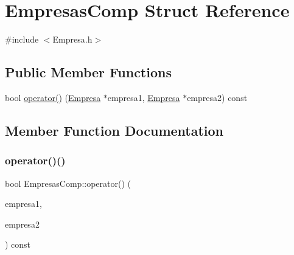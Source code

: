 \hypertarget{structEmpresasComp}{}\section{Empresas\+Comp Struct Reference}
\label{structEmpresasComp}


{\ttfamily \#include $<$Empresa.\+h$>$}

\subsection*{Public Member Functions}
\begin{DoxyCompactItemize}
\item 
bool \hyperlink{structEmpresasComp_a65f437399b6aa939ee84611a69ee0ad0}{operator()} (\hyperlink{classEmpresa}{Empresa} $\ast$empresa1, \hyperlink{classEmpresa}{Empresa} $\ast$empresa2) const
\end{DoxyCompactItemize}


\subsection{Member Function Documentation}
\mbox{\label{structEmpresasComp_a65f437399b6aa939ee84611a69ee0ad0}} 
\subsubsection{\texorpdfstring{operator()()}{operator()()}}
{\footnotesize\ttfamily bool Empresas\+Comp\+::operator() (\begin{DoxyParamCaption}\item[{\hyperlink{classEmpresa}{Empresa} $\ast$}]{empresa1,  }\item[{\hyperlink{classEmpresa}{Empresa} $\ast$}]{empresa2 }\end{DoxyParamCaption}) const\hspace{0.3cm}{\ttfamily [inline]}}


